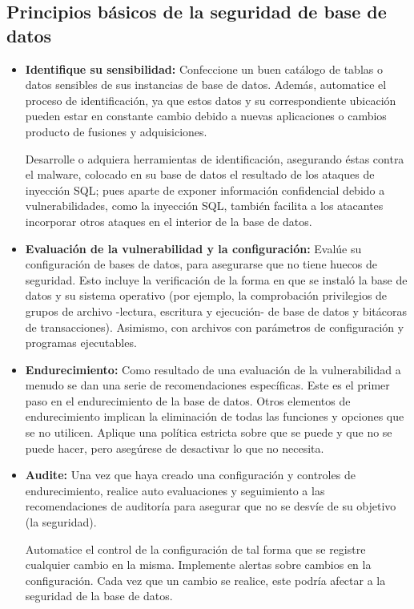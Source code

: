 \documentclass[%
 reprint,
 amsmath,amssymb,
 aps,
]{revtex4-1}
\begin{document}

\subsection{Principios básicos de la seguridad de base de datos}
\begin{itemize}
	\item \textbf{Identifique su sensibilidad: }Confeccione un buen catálogo de tablas o datos sensibles de sus instancias de base de datos. Además, automatice el proceso de identificación, ya que estos datos y su correspondiente ubicación pueden estar en constante cambio debido a nuevas aplicaciones o cambios producto de fusiones y adquisiciones.
	\par Desarrolle o adquiera herramientas de identificación, asegurando éstas contra el malware, colocado en su base de datos el resultado de los ataques de inyección SQL; pues aparte de exponer información confidencial debido a vulnerabilidades, como la inyección SQL, también facilita a los atacantes incorporar otros ataques en el interior de la base de datos.
	\item \textbf{Evaluación de la vulnerabilidad y la configuración: }Evalúe su configuración de bases de datos, para asegurarse que no tiene huecos de seguridad.
Esto incluye la verificación de la forma en que se instaló la base de datos y su sistema operativo (por ejemplo, la comprobación privilegios de grupos de archivo -lectura, escritura y ejecución- de base de datos y bitácoras de transacciones). Asimismo, con archivos con parámetros de configuración y programas ejecutables.
	\item \textbf{Endurecimiento: }Como resultado de una evaluación de la vulnerabilidad a menudo se dan una serie de recomendaciones específicas. Este es el primer paso en el endurecimiento de la base de datos. Otros elementos de endurecimiento implican la eliminación de todas las funciones y opciones que se no utilicen. Aplique una política estricta sobre que se puede y que no se puede hacer, pero asegúrese de desactivar lo que no necesita.
	\item \textbf{Audite: }Una vez que haya creado una configuración y controles de endurecimiento, realice auto evaluaciones y seguimiento a las recomendaciones de auditoría para asegurar que no se desvíe de su objetivo (la seguridad).
\par Automatice el control de la configuración de tal forma que se registre cualquier cambio en la misma. Implemente alertas sobre cambios en la configuración. Cada vez que un cambio se realice, este podría afectar a la seguridad de la base de datos.

\end{itemize}
\end{document}
